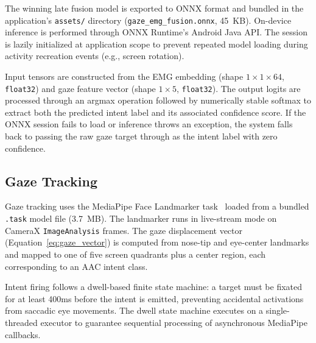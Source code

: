 The winning late fusion model is exported to ONNX format and bundled in the application's \texttt{assets/} directory (\texttt{gaze\_emg\_fusion.onnx}, 45~KB). On-device inference is performed through ONNX Runtime's Android Java API. The session is lazily initialized at application scope to prevent repeated model loading during activity recreation events (e.g., screen rotation).

Input tensors are constructed from the EMG embedding (shape $1 \times 1 \times 64$, \texttt{float32}) and gaze feature vector (shape $1 \times 5$, \texttt{float32}). The output logits are processed through an argmax operation followed by numerically stable softmax to extract both the predicted intent label and its associated confidence score. If the ONNX session fails to load or inference throws an exception, the system falls back to passing the raw gaze target through as the intent label with zero confidence.

\subsection{Gaze Tracking}
\label{sec:gaze_impl}

Gaze tracking uses the MediaPipe Face Landmarker task~\cite{mediapipe} loaded from a bundled \texttt{.task} model file (3.7~MB). The landmarker runs in live-stream mode on CameraX \texttt{ImageAnalysis} frames. The gaze displacement vector (Equation~\ref{eq:gaze_vector}) is computed from nose-tip and eye-center landmarks and mapped to one of five screen quadrants plus a center region, each corresponding to an AAC intent class.

Intent firing follows a dwell-based finite state machine: a target must be fixated for at least 400ms before the intent is emitted, preventing accidental activations from saccadic eye movements. The dwell state machine executes on a single-threaded executor to guarantee sequential processing of asynchronous MediaPipe callbacks.

